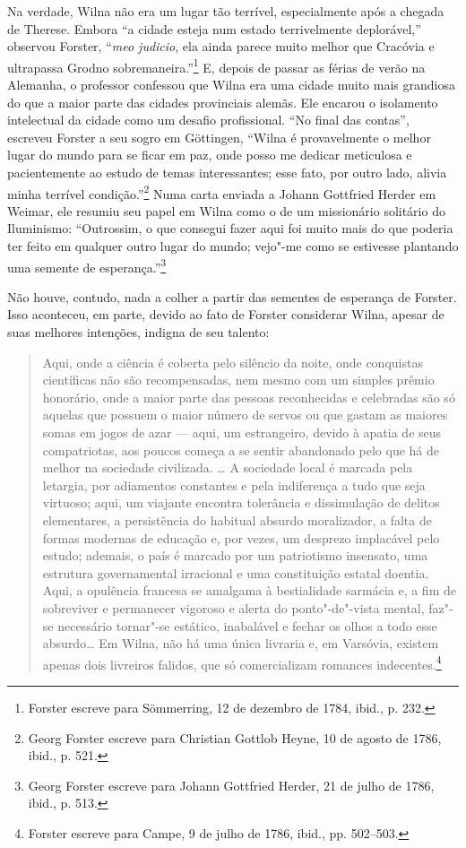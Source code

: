 Na verdade, Wilna não era um lugar tão terrível, especialmente após a
chegada de Therese. Embora ``a cidade esteja num estado terrivelmente
deplorável,'' observou Forster, ``\emph{meo judicio}, ela ainda parece
muito melhor que Cracóvia e ultrapassa Grodno sobremaneira.''\footnote{Forster
  escreve para Sömmerring, 12 de dezembro de 1784, ibid., p. 232.} E,
depois de passar as férias de verão na Alemanha, o professor confessou
que Wilna era uma cidade muito mais grandiosa do que a maior parte das
cidades provinciais alemãs. Ele encarou o isolamento intelectual da
cidade como um desafio profissional. ``No final das contas'', escreveu
Forster a seu sogro em Göttingen, ``Wilna é provavelmente o melhor lugar
do mundo para se ficar em paz, onde posso me dedicar meticulosa e
pacientemente ao estudo de temas interessantes; esse fato, por outro
lado, alivia minha terrível condição.''\footnote{Georg Forster escreve
  para Christian Gottlob Heyne, 10 de agosto de 1786, ibid., p. 521.}
Numa carta enviada a Johann Gottfried Herder em Weimar, ele resumiu seu
papel em Wilna como o de um missionário solitário do Iluminismo:
``Outrossim, o que consegui fazer aqui foi muito mais do que poderia ter
feito em qualquer outro lugar do mundo; vejo"-me como se estivesse
plantando uma semente de esperança.''\footnote{Georg Forster escreve
  para Johann Gottfried Herder, 21 de julho de 1786, ibid., p. 513.}

Não houve, contudo, nada a colher a partir das sementes de esperança de
Forster. Isso aconteceu, em parte, devido ao fato de Forster considerar
Wilna, apesar de suas melhores intenções, indigna de seu talento:

\begin{quote}
Aqui, onde a ciência é coberta pelo silêncio da noite, onde conquistas
científicas não são recompensadas, nem mesmo com um simples prêmio
honorário, onde a maior parte das pessoas reconhecidas e celebradas são
só aquelas que possuem o maior número de servos ou que gastam as maiores
somas em jogos de azar --- aqui, um estrangeiro, devido à apatia de seus
compatriotas, aos poucos começa a se sentir abandonado pelo que há de
melhor na sociedade civilizada. \ldots{} A sociedade local é marcada
pela letargia, por adiamentos constantes e pela indiferença a tudo que
seja virtuoso; aqui, um viajante encontra tolerância e dissimulação de
delitos elementares, a persistência do habitual absurdo moralizador, a
falta de formas modernas de educação e, por vezes, um desprezo
implacável pelo estudo; ademais, o país é marcado por um patriotismo
insensato, uma estrutura governamental irracional e uma constituição
estatal doentia. Aqui, a opulência francesa se amalgama à bestialidade
sarmácia e, a fim de sobreviver e permanecer vigoroso e alerta do
ponto"-de"-vista mental, faz"-se necessário tornar"-se estático, inabalável
e fechar os olhos a todo esse absurdo\ldots{} Em Wilna, não há uma única
livraria e, em Varsóvia, existem apenas dois livreiros falidos, que só
comercializam romances indecentes.\footnote{Forster escreve para Campe,
  9 de julho de 1786, ibid., pp. 502--503.}
  \end{quote}

